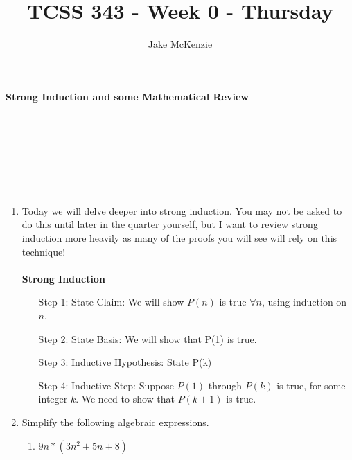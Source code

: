 \documentclass[12pt]{article}
\begin{document}
\title{TCSS 343 - Week 0 - Thursday}
\author{Jake McKenzie}
\maketitle
\noindent\centerline{\textbf{Strong Induction and some Mathematical Review}}\\\\\\\\\\\\
\newpage
\begin{enumerate}
\item Today we will delve deeper into strong induction. You may not 
be asked to do this until later in the quarter yourself, but I want 
to review strong induction more heavily as many of the proofs you will 
see will rely on this technique! 
\\\\
\textbf{Strong Induction}\\
\begin{enumerate}
\item[Step 1:] State Claim: We will show $P(n)$ is true $\forall n$, 
using induction on $n$.
\item[Step 2:]  State Basis: We will show that P(1) is true.
\item[Step 3:]  Inductive Hypothesis: State P(k)
\item[Step 4:]  Inductive Step: Suppose $P(1)$ through $P(k)$ is true, for some integer $k$.
We need to show that $P(k+1)$ is true. 
\end{enumerate}

\newpage
\item Simplify the following algebraic expressions.
\begin{enumerate}
\item $9n*(3n^2+5n+8)$
\end{enumerate}    
\end{enumerate}
\end{document}
